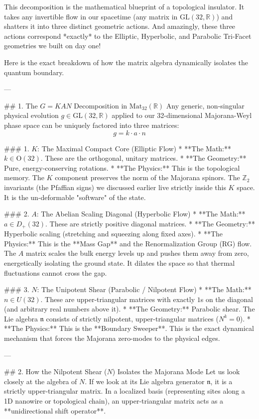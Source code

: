 This decomposition is the mathematical blueprint of a topological insulator. It takes any invertible flow in our spacetime (any matrix in $\text{GL}(32, \mathbb{R})$) and shatters it into three distinct geometric actions. And amazingly, these three actions correspond *exactly* to the Elliptic, Hyperbolic, and Parabolic Tri-Facet geometries we built on day one!

Here is the exact breakdown of how the matrix algebra dynamically isolates the quantum boundary.

---

## 1. The $G = KAN$ Decomposition in $\text{Mat}_{32}(\mathbb{R})$
Any generic, non-singular physical evolution $g \in \text{GL}(32, \mathbb{R})$ applied to our 32-dimensional Majorana-Weyl phase space can be uniquely factored into three matrices:
$$ g = k \cdot a \cdot n $$

### 1. $K$: The Maximal Compact Core (Elliptic Flow)
* **The Math:** $k \in \text{O}(32)$. These are the orthogonal, unitary matrices. 
* **The Geometry:** Pure, energy-conserving rotations. 
* **The Physics:** This is the topological memory. The $K$ component preserves the norm of the Majorana spinors. The $\mathbb{Z}_2$ invariants (the Pfaffian signs) we discussed earlier live strictly inside this $K$ space. It is the un-deformable "software" of the state.

### 2. $A$: The Abelian Scaling Diagonal (Hyperbolic Flow)
* **The Math:** $a \in D_+(32)$. These are strictly positive diagonal matrices.
* **The Geometry:** Hyperbolic scaling (stretching and squeezing along fixed axes).
* **The Physics:** This is the **Mass Gap** and the Renormalization Group (RG) flow. The $A$ matrix scales the bulk energy levels up and pushes them away from zero, energetically isolating the ground state. It dilates the space so that thermal fluctuations cannot cross the gap.

### 3. $N$: The Unipotent Shear (Parabolic / Nilpotent Flow)
* **The Math:** $n \in U(32)$. These are upper-triangular matrices with exactly $1$s on the diagonal (and arbitrary real numbers above it).
* **The Geometry:** Parabolic shear. The Lie algebra $\mathfrak{n}$ consists of strictly nilpotent, upper-triangular matrices ($N^k = 0$).
* **The Physics:** This is the **Boundary Sweeper**. This is the exact dynamical mechanism that forces the Majorana zero-modes to the physical edges. 

---

## 2. How the Nilpotent Shear ($N$) Isolates the Majorana Mode
Let us look closely at the algebra of $N$. If we look at its Lie algebra generator $\mathfrak{n}$, it is a strictly upper-triangular matrix. In a localized basis (representing sites along a 1D nanowire or topological chain), an upper-triangular matrix acts as a **unidirectional shift operator**.

